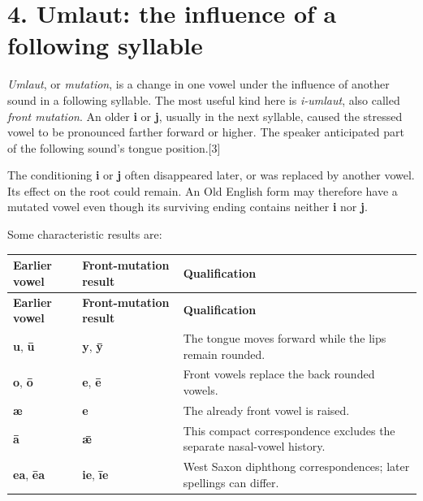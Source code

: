 \section*{4. Umlaut: the influence of a following syllable}
\emph{Umlaut}, or \emph{mutation}, is a change in one vowel under the influence of another sound in a following syllable. The most useful kind here is \emph{i-umlaut}, also called \emph{front mutation}. An older \textbf{i} or \textbf{j}, usually in the next syllable, caused the stressed vowel to be pronounced farther forward or higher. The speaker anticipated part of the following sound’s tongue position.[3]\par
The conditioning \textbf{i} or \textbf{j} often disappeared later, or was replaced by another vowel. Its effect on the root could remain. An Old English form may therefore have a mutated vowel even though its surviving ending contains neither \textbf{i} nor \textbf{j}.\par
Some characteristic results are:\par
\begingroup
\fontsize{10.5}{13.2}\selectfont
\setlength{\LTleft}{0pt}
\setlength{\LTright}{0pt plus 1fil}
\begin{longtable}{@{}>{\raggedright\arraybackslash}p{}>{\raggedright\arraybackslash}p{}>{\raggedright\arraybackslash}p{}@{}}
\toprule
\textbf{Earlier vowel} & \textbf{Front-mutation result} & \textbf{Qualification} \\
\midrule
\endfirsthead
\toprule
\textbf{Earlier vowel} & \textbf{Front-mutation result} & \textbf{Qualification} \\
\midrule
\endhead
\bottomrule
\endfoot
\bottomrule
\endlastfoot
\textbf{u}, \textbf{ū} & \textbf{y}, \textbf{ȳ} & The tongue moves forward while the lips remain rounded. \\
\textbf{o}, \textbf{ō} & \textbf{e}, \textbf{ē} & Front vowels replace the back rounded vowels. \\
\textbf{æ} & \textbf{e} & The already front vowel is raised. \\
\textbf{ā} & \textbf{ǣ} & This compact correspondence excludes the separate nasal-vowel history. \\
\textbf{ea}, \textbf{ēa} & \textbf{ie}, \textbf{īe} & West Saxon diphthong correspondences; later spellings can differ. \\
\end{longtable}
